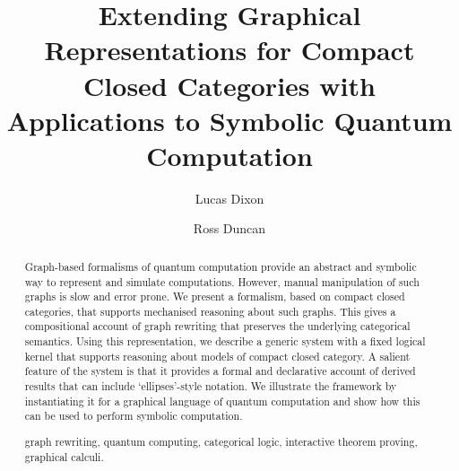 \documentclass[runningheads]{llncs}
\newcommand{\keywords}[1]{\par\addvspace\baselineskip
\noindent\keywordname\enspace\ignorespaces#1}
\begin{document}
\mainmatter  %

\title{Extending Graphical Representations for Compact Closed Categories with
Applications to Symbolic Quantum Computation}


%
%
\author{Lucas Dixon \and Ross Duncan}
%


%
%
\maketitle


\begin{abstract}
  Graph-based formalisms of quantum computation provide an
  abstract and symbolic way to represent and simulate computations.
  However, manual manipulation of such graphs is slow and error prone.
  We present a formalism, based on compact closed categories, that
  supports mechanised reasoning about such graphs. This gives a
  compositional account of graph rewriting that preserves the
  underlying categorical semantics. Using this representation, we
  describe a generic system with a fixed logical kernel that supports
  reasoning about models of compact closed category. A salient feature
  of the system is that it provides a formal and declarative account
  of derived results that can include `ellipses'-style notation. We
  illustrate the framework by instantiating it for a graphical
  language of quantum computation and show how this can be used to
  perform symbolic computation.

  \keywords{graph rewriting, quantum computing, categorical logic,
    interactive theorem proving, graphical calculi.}
\end{abstract}
\end{document}
